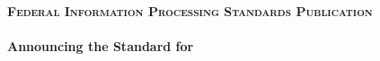 
{

\begin{center}

\normalsize{\textbf{\textsc{Federal Information Processing Standards Publication }}}\\
\vspace{10pt}
\normalsize{\textbf{}}\\
\vspace{10pt}
\normalsize{\textbf{Announcing the Standard for}}\\
\Large{\textbf{}}
\end{center}

\vspace{10pt}

\titleformat{\section}[runin]{\normalsize\raggedright\bfseries}{}{0em}{}	%
\titleformat{\subsection}[runin]{\normalsize\raggedright\bfseries}{}{0em}{}	%



}